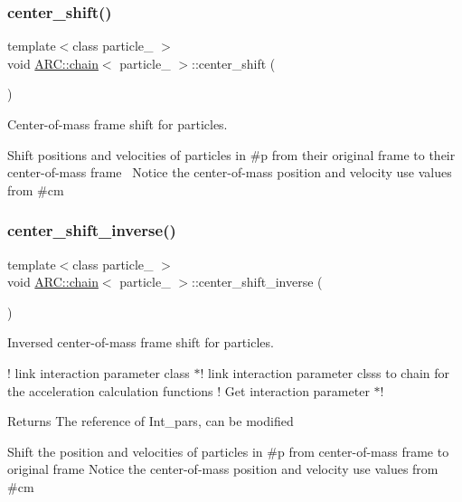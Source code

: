 \subsubsection{\texorpdfstring{center\+\_\+shift()}{center\_shift()}}
{\footnotesize\ttfamily template$<$class particle\+\_\+ $>$ \\
void \hyperlink{classARC_1_1chain}{A\+R\+C\+::chain}$<$ particle\+\_\+ $>$\+::center\+\_\+shift (\begin{DoxyParamCaption}{ }\end{DoxyParamCaption})\hspace{0.3cm}{\ttfamily [inline]}}



Center-\/of-\/mass frame shift for particles. 

Shift positions and velocities of particles in \#p from their original frame to their center-\/of-\/mass frame~\newline
Notice the center-\/of-\/mass position and velocity use values from \#cm \hypertarget{classARC_1_1chain_ab56fbddf27416cd640c535ec267cc4bc}{}\label{classARC_1_1chain_ab56fbddf27416cd640c535ec267cc4bc} 
\subsubsection{\texorpdfstring{center\+\_\+shift\+\_\+inverse()}{center\_shift\_inverse()}}
{\footnotesize\ttfamily template$<$class particle\+\_\+ $>$ \\
void \hyperlink{classARC_1_1chain}{A\+R\+C\+::chain}$<$ particle\+\_\+ $>$\+::center\+\_\+shift\+\_\+inverse (\begin{DoxyParamCaption}{ }\end{DoxyParamCaption})\hspace{0.3cm}{\ttfamily [inline]}}



Inversed center-\/of-\/mass frame shift for particles. 

! link interaction parameter class $\ast$! link interaction parameter clsss to chain for the acceleration calculation functions ! Get interaction parameter $\ast$! \begin{DoxyReturn}{Returns}
The reference of Int\+\_\+pars, can be modified
\end{DoxyReturn}
Shift the position and velocities of particles in \#p from center-\/of-\/mass frame to original frame Notice the center-\/of-\/mass position and velocity use values from \#cm \hypertarget{classARC_1_1chain_a4cf8d7e8253d71ce0110fb827add1b32}{}\label{classARC_1_1chain_a4cf8d7e8253d71ce0110fb827add1b32} 
